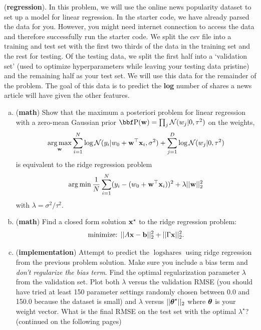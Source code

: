 \documentclass[12pt,letterpaper]{hmcpset}
\begin{document}
\begin{problem}[3]
(\textbf{regression}). In this problem, we will use the online news popularity dataset to set up a model for linear regression. In the starter code, we have already parsed the data for you. However, you might need internet connection to access the data and therefore successfully run the starter code.
\newline \newline
We split the csv file into a training and test set with
the first two thirds of the data in the training set and the rest for testing.
Of the testing data, we split the first half into a `validation set' (used
to optimize hyperparameters while leaving your testing data pristine) and
the remaining half as your test set.
We will use this data for the remainder of the problem. The goal of this data
is to predict the \textbf{log} number of shares a news article will have given the other
features.
\newline \newline
\begin{enumerate}[(a)]
	\item (\textbf{math}) Show that the maximum a posteriori problem for
	linear regression with a zero-mean Gaussian prior $\PP(\ww) = \prod_j
	\Nc(w_j | 0, \tau^2)$ on the weights,
	$$
	\operatorname*{arg\,max}_{\bf w} \sum_{i=1}^N \log{\cal N}(y_i | w_0 + {\bf w}^\top{\bf x}_i, \sigma^2) + \sum_{j=1}^D \log{\cal N}(w_j | 0, \tau^2)
	$$
	is equivalent to the ridge regression problem
	$$
	\operatorname*{arg\,min} \frac{1}{N}\sum_{i=1}^N (y_i - (w_0 + {\bf w}^\top{\bf x}_i))^2 + \lambda ||{\bf w}||_2^2
	$$
	with $\lambda = \sigma^2 / \tau^2$.
	\newline
	\item (\textbf{math}) Find a closed form solution ${\bf x}^\star$ to the ridge regression
	problem:
	$$
	\text{minimize: } ||A{\bf x} - {\bf b}||_2^2 + ||\Gamma{\bf x}||_2^2.
	$$
	
	\item
	(\textbf{implementation}) Attempt to predict the $\log\text{shares}$ using ridge
regression from the previous problem solution. Make sure you include a bias
term and \textit{don't regularize the bias term}.
Find the optimal regularization parameter $\lambda$
from the validation set. Plot both $\lambda$ versus the validation RMSE (you should have
tried at least 150 parameter settings randomly chosen between 0.0 and 150.0 because
the dataset is small)
and $\lambda$ versus $||\hbox{\boldmath$\theta$}^\star||_2$ where $\hbox{\boldmath$\theta$}$ is your weight vector.
What is the final RMSE on the test set with the optimal $\lambda^\star$?\\
\newline
(continued on the following pages)
\end{enumerate}
\end{problem}
\begin{solution}
	\vfill
\end{solution}
\newpage
\end{document}
